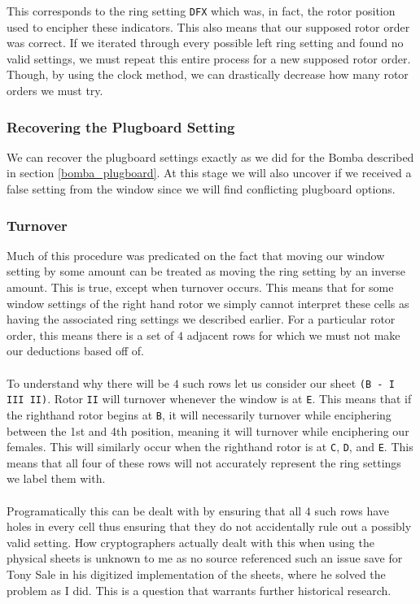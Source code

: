\noindent This corresponds to the ring setting \texttt{DFX} which was, in fact, the rotor position used to encipher these indicators. This also means that our supposed rotor order was correct. If we iterated through every possible left ring setting and found no valid settings, we must repeat this entire process for a new supposed rotor order. Though, by using the clock method, we can drastically decrease how many rotor orders we must try.

\subsubsection{Recovering the Plugboard Setting}
We can recover the plugboard settings exactly as we did for the Bomba described in section \ref{bomba_plugboard}. At this stage we will also uncover if we received a false setting from the window since we will find conflicting plugboard options.

\subsubsection{Turnover}
Much of this procedure was predicated on the fact that moving our window setting by some amount can be treated as moving the ring setting by an inverse amount. This is true, except when turnover occurs. This means that for some window settings of the right hand rotor we simply cannot interpret these cells as having the associated ring settings we described earlier. For a particular rotor order, this means there is a set of $4$ adjacent rows for which we must not make our deductions based off of.\\\\To understand why there will be $4$ such rows let us consider our sheet \texttt{(B - I III II)}. Rotor \texttt{II} will turnover whenever the window is at \texttt{E}. This means that if the righthand rotor begins at \texttt{B}, it will necessarily turnover while enciphering between the 1st and 4th position, meaning it will turnover while enciphering our females. This will similarly occur when the righthand rotor is at \texttt{C}, \texttt{D}, and \texttt{E}. This means that all four of these rows will not accurately represent the ring settings we label them with.
\\\\Programatically this can be dealt with by ensuring that all $4$ such rows have holes in every cell thus ensuring that they do not accidentally rule out a possibly valid setting. How cryptographers actually dealt with this when using the physical sheets is unknown to me as no source referenced such an issue save for Tony Sale in his digitized implementation of the sheets, where he solved the problem as I did. This is a question that warrants further historical research.

